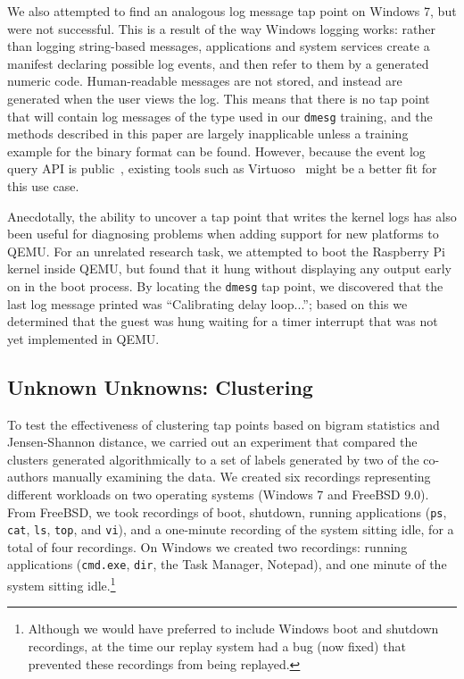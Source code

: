 We also attempted to find an analogous log message tap point on Windows
7, but were not successful. This is a result of the way Windows logging
works: rather than logging string-based messages, applications and
system services create a manifest declaring possible log events, and
then refer to them by a generated numeric code. Human-readable messages
are not stored, and instead are generated when the user views the log.
This means that there is no tap point that will contain log messages of
the type used in our \texttt{dmesg} training, and the methods described
in this paper are largely inapplicable unless a training example for the
binary format can be found. However, because the event log query API
is public~\cite{evtquery}, existing tools such as
Virtuoso~\cite{Dolan-Gavitt:2011uq} might be a better fit for this use
case.

Anecdotally, the ability to uncover a tap point that writes the kernel
logs has also been useful for diagnosing problems when adding support
for new platforms to QEMU. For an unrelated research task, we attempted
to boot the Raspberry Pi~\cite{raspberrypi} kernel inside QEMU, but
found that it hung without displaying any output early on in the boot
process. By locating the \texttt{dmesg} tap point, we discovered that
the last log message printed was ``Calibrating delay loop...''; based on
this we determined that the guest was hung waiting for a timer interrupt
that was not yet implemented in QEMU.

\subsection{Unknown Unknowns: Clustering}
\label{sec:eval:subsec:cluster}

To test the effectiveness of clustering tap points based on bigram
statistics and Jensen-Shannon distance, we carried out an experiment
that compared the clusters generated algorithmically to a set of labels
generated by two of the co-authors manually examining the data. We
created six recordings representing different workloads on two operating
systems (Windows 7 and FreeBSD 9.0). From FreeBSD, we took recordings of
boot, shutdown, running applications (\texttt{ps}, \texttt{cat},
\texttt{ls}, \texttt{top}, and \texttt{vi}), and a one-minute recording
of the system sitting idle, for a total of four recordings. On Windows
we created two recordings: running applications (\texttt{cmd.exe},
\texttt{dir}, the Task Manager, Notepad), and one minute of the system
sitting idle.\footnote{Although we would have preferred to include
Windows boot and shutdown recordings, at the time our replay system had
a bug (now fixed) that prevented these recordings from being replayed.}

